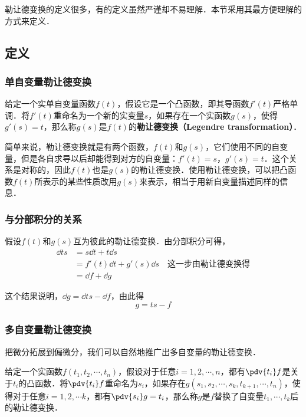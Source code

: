 

勒让德变换的定义很多，有的定义虽然严谨却不易理解．本节采用其最方便理解的方式来定义．

\subsection{定义}

\subsubsection{单自变量勒让德变换}
\begin{definition}{}
给定一个实单自变量函数$f(t)$，假设它是一个凸函数，即其导函数$f'(t)$严格单调．将$f'(t)$重命名为一个新的实变量$s$，如果存在一个实函数$g(s)$，使得$g'(s)=t$，那么称$g(s)$是$f(t)$的\textbf{勒让德变换（Legendre transformation）}．
\end{definition}

简单来说，勒让德变换就是有两个函数，$f(t)$和$g(s)$，它们使用不同的自变量，但是各自求导以后却能得到对方的自变量：$f'(t)=s$，$g'(s)=t$．这个关系是对称的，因此$f(t)$也是$g(s)$的勒让德变换．使用勒让德变换，可以把凸函数$f(t)$所表示的某些性质改用$g(s)$来表示，相当于用新自变量描述同样的信息．

\subsubsection{与分部积分的关系}

假设$f(t)$和$g(s)$互为彼此的勒让德变换．由分部积分可得，
\begin{equation}
\begin{aligned}
\dd{ts}&=s\dd{t}+t\dd{s}\\&=f'(t)\dd{t}+g'(s)\dd{s}\quad\text{这一步由勒让德变换得}\\&=\dd{f}+\dd{g}
\end{aligned}
\end{equation}

这个结果说明，$\dd{g}=\dd{ts}-\dd{f}$，由此得
\begin{equation}
g=ts-f
\end{equation}


\subsubsection{多自变量勒让德变换}

把微分拓展到偏微分，我们可以自然地推广出多自变量的勒让德变换．

\begin{definition}{}\label{TrLgdr_def1}
给定一个实函数$f(t_1, t_2, \cdots, t_n)$，假设对于任意$i=1, 2, \cdots, n$，都有$\pdv{t_i}f$是关于$t_i$的凸函数．将$\pdv{t_i}f$重命名为$s_i$，如果存在$g(s_1, s_2, \cdots, s_k, t_{k+1},\cdots, t_n)$，使得对于任意$i=1,2,\cdots k$，都有$\pdv{s_i}g=t_i$，那么称$g$是$f$替换了自变量$t_1, \cdots, t_k$后的勒让德变换．
\end{definition}

